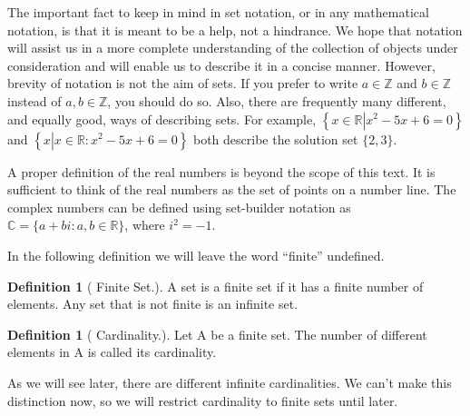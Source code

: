\documentclass[10pt,]{book}
\theoremstyle{plain}
\theoremstyle{definition}
\newtheorem{definition}[theorem]{Definition}
\begin{document}
The important fact to keep in mind in set notation, or in any mathematical notation, is that it is meant to be a help, not a hindrance. We hope that notation will assist us in a more complete understanding of the collection of objects under consideration and will enable us to describe it in a concise manner. However, brevity of notation is not the aim of sets. If you prefer to write \(a\in \mathbb{Z}\) and \(b\in \mathbb{Z}\) instead of \(a, b\in \mathbb{Z}\), you should do so. Also, there are frequently many different, and equally good, ways of describing sets. For example, \(\left\{x\in
\mathbb{R}\left| x^{2 }-5x+6\right.=0\right\}\) and \(\left\{x \left| x\in \mathbb{R}: x^{2 }-5x+6\right.=0\right\}\) both describe the solution set \(\{2, 3\}\). 
%
\par
A proper definition of the real numbers is beyond the scope of this text. It is sufficient to think of the real numbers as the set of points on a
number line. The complex numbers can be defined using set-builder notation as \(\mathbb{C} = \{a + b i:a, b \in \mathbb{R}\}\), where \(i^2 = -1\).  %
\par
In the following definition we will leave the word ``finite'' undefined.   
%
\begin{definition}[ Finite Set.]\label{finite-set}
A set is a finite set if it has a finite number of elements. Any set that is not finite is an infinite set.
	\end{definition}
\begin{definition}[ Cardinality.]\label{cardinality.}
Let A be a finite set. The number of different elements in A is called its cardinality.
\end{definition}
\label{notation-1}
\par
As we will see later, there are different infinite cardinalities. We can't make this distinction now, so we will restrict cardinality to finite sets
until later.%
\typeout{************************************************}
\typeout{************************************************}
\end{document}
